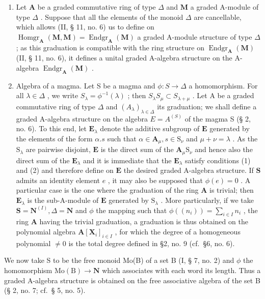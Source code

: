 \begin{enumerate}
\def\labelenumi{(\arabic{enumi})}
\setcounter{enumi}{1}
\item
  Let \(\mathbf{A}\) be a graded commutative ring of type \(\Delta\) and \(\mathbf{M}\) a graded A-module of type \(\Delta\) . Suppose that all the elements of the monoid \(\Delta\) are cancellable, which allows (II, § 11, no. 6) us to define on \(\operatorname{Homgr}_{\mathbf{A}}(\mathbf{M}, \mathbf{M}) = \operatorname{Endgr}_{\mathbf{A}}(\mathbf{M})\) a graded A-module structure of type \(\Delta\) ; as this graduation is compatible with the ring structure on \(\operatorname{Endgr}_{\mathbf{A}}(\mathbf{M})\) (II, § 11, no. 6), it defines a unital graded A-algebra structure on the A-algebra \(\operatorname{Endgr}_{\mathbf{A}}(\mathbf{M})\) .
\item
  Algebra of a magma. Let S be a magma and \(\phi: S \to \Delta\) a homomorphism. For all \(\lambda \in \Delta\) , we write \(S_{\lambda} = \phi^{-1}(\lambda)\) ; then \(S_{\lambda}S_{\mu} \subset S_{\lambda + \mu}\) . Let A be a graded commutative ring of type \(\Delta\) and \((A_{\lambda})_{\lambda \in \Delta}\) its graduation; we shall define a graded A-algebra structure on the algebra \(E = A^{(S)}\) of the magma S (§ 2, no. 6). To this end, let \(\mathbf{E}_{\lambda}\) denote the additive subgroup of \(\mathbf{E}\) generated by the elements of the form \(\alpha .s\) such that \(\alpha \in \mathbf{A}_{\mu}, s \in \mathrm{S}_{\nu}\) and \(\mu + \nu = \lambda\) . As the \(\mathrm{S}_{\lambda}\) are pairwise disjoint, \(\mathbf{E}\) is the direct sum of the \(\mathbf{A}_{\mu}\mathrm{S}_{\nu}\) and hence also the direct sum of the \(\mathbf{E}_{\lambda}\) and it is immediate that the \(\mathbf{E}_{\lambda}\) satisfy conditions (1) and (2) and therefore define on \(\mathbf{E}\) the desired graded A-algebra structure. If \(\mathbf{S}\) admits an identity element \(e\) , it may also be supposed that \(\phi(e) = 0\) . A particular case is the one where the graduation of the ring \(\mathbf{A}\) is trivial; then \(\mathbf{E}_{\lambda}\) is the sub-A-module of \(\mathbf{E}\) generated by \(\mathrm{S}_{\lambda}\) . More particularly, if we take \(\mathbf{S} = \mathbf{N}^{(I)}, \Delta = \mathbf{N}\) and \(\phi\) the mapping such that \(\phi((n_{i})) = \sum_{i \in I} n_{i}\) , the ring \(\mathbf{A}\) having the trivial graduation, a graduation is thus obtained on the polynomial algebra \(\mathbf{A}[\mathbf{X}_{i}]_{i \in I}\) , for which the degree of a homogeneous polynomial \(\neq 0\) is the total degree defined in §2, no. 9 (cf.~§6, no. 6).
\end{enumerate}

We now take S to be the free monoid Mo(B) of a set B (I, § 7, no. 2) and \(\phi\) the homomorphism \(\mathrm{Mo(B)} \to \mathbf{N}\) which associates with each word its length. Thus a graded A-algebra structure is obtained on the free associative algebra of the set B (§ 2, no. 7; cf.~§ 5, no. 5).

